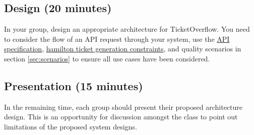 \documentclass{csse4400}
\begin{document}
\subsection*{Design (20 minutes)}

In your group, design an appropriate architecture for TicketOverflow.
You need to consider the flow of an API request through your system,
use the \href{https://csse6400.uqcloud.net/api/ticketoverflow}{API specification},
\href{https://github.com/CSSE6400/hamilton}{hamilton ticket generation constraints},
and quality scenarios in section \ref{sec:scenarios} to ensure all use cases have been considered.


\subsection*{Presentation (15 minutes)}

In the remaining time,
each group should present their proposed architecture design.
This is an opportunity for discussion amongst the class to point out limitations of the proposed system designs.
\end{document}
